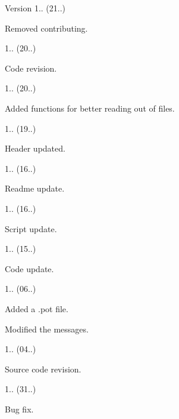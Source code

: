 \begin{DoxyVersion}{Version}
1.. (21..)
\begin{DoxyItemize}
\item Removed contributing. 
\end{DoxyItemize}

1.. (20..)
\begin{DoxyItemize}
\item Code revision. 
\end{DoxyItemize}

1.. (20..)
\begin{DoxyItemize}
\item Added functions for better reading out of files. 
\end{DoxyItemize}

1.. (19..)
\begin{DoxyItemize}
\item Header updated. 
\end{DoxyItemize}

1.. (16..)
\begin{DoxyItemize}
\item Readme update. 
\end{DoxyItemize}

1.. (16..)
\begin{DoxyItemize}
\item Script update. 
\end{DoxyItemize}

1.. (15..)
\begin{DoxyItemize}
\item Code update. 
\end{DoxyItemize}

1.. (06..)
\begin{DoxyItemize}
\item Added a .pot file.
\item Modified the messages. 
\end{DoxyItemize}

1.. (04..)
\begin{DoxyItemize}
\item Source code revision. 
\end{DoxyItemize}

1.. (31..)
\begin{DoxyItemize}
\item Bug fix. 
\end{DoxyItemize}


\end{DoxyVersion}
